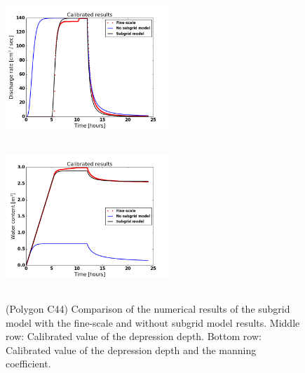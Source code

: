 \documentclass[review,11pt]{elsarticle}
\begin{document}
\begin{figure}
\includegraphics[width=6.2cm, height=5.5cm]{./figures/POLYGON44/POLYGON44dischargeCalibDDManning.png}
\includegraphics[width=6.2cm, height=5.5cm]{./figures/POLYGON44/POLYGON44watercontentCalibDDManning.png}
\caption{(Polygon C44) Comparison of the numerical results of the subgrid model with the fine-scale and without subgrid model results. Middle row: Calibrated value of the depression depth. Bottom row: Calibrated value of the depression depth and the manning coefficient.}
\label{polygon-C44}
\end{figure}
\end{document}
